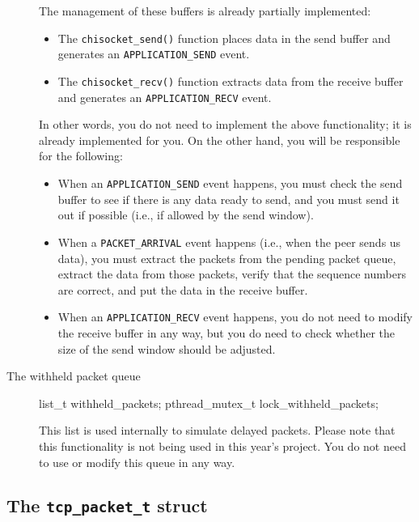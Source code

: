 \documentclass[10pt]{article}
\newenvironment{example}%
{\VerbatimEnvironment\begin{Sbox}\begin{VerbExample}}%
{\end{VerbExample}\end{Sbox}\setlength{\fboxsep}{8pt}\begin{center}\fcolorbox{black}{backgroundgray}{\TheSbox}\end{center}}
\begin{document}
\begin{description}
The management of these buffers is already partially implemented:

\begin{itemize}
 \item The \texttt{chisocket\_send()} function places data in the send buffer and generates an \texttt{APPLICATION\_SEND} event.
 \item The \texttt{chisocket\_recv()} function extracts data from the receive buffer and generates an \texttt{APPLICATION\_RECV} event.
\end{itemize}

In other words, you do not need to implement the above functionality; it is already implemented for you. On the other hand, you will be responsible for the following:

\begin{itemize}
 \item When an \texttt{APPLICATION\_SEND} event happens, you must check the send buffer to see if there is any data ready to send, and you must send it out if possible (i.e., if allowed by the send window).
 \item When a \texttt{PACKET\_ARRIVAL} event happens (i.e., when the peer sends us data), you must extract the packets from the pending packet queue, extract the data from those packets, verify that the sequence numbers are correct, and put the data in the receive buffer.
  \item When an \texttt{APPLICATION\_RECV} event happens, you do not need to modify the receive buffer in any way, but you do need to check whether the size of the send window should be adjusted.
\end{itemize}

 \item[The withheld packet queue]

\begin{example}
list_t withheld_packets;
pthread_mutex_t lock_withheld_packets;
\end{example}

This list is used internally to simulate delayed packets. Please note that this functionality is not being used in this year's project. You do not need to use or modify this queue in any way.
\end{description}

\subsection{The \texttt{tcp\_packet\_t} struct}
\end{document}

